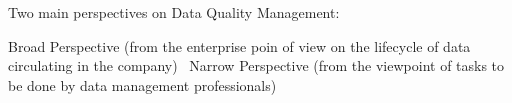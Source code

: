 Two main perspectives on Data Quality Management:

Broad Perspective (from the enterprise poin of view on the lifecycle of data circulating in the company)~\cite{book:dama}
Narrow Perspective (from the viewpoint of tasks to be done by data management professionals)~\cite{pres:dcam}






